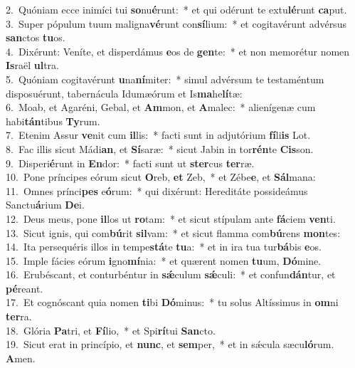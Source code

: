 {2.~}Quóniam ecce inimíci tui \textbf{so}nu\textbf{é}runt:~* et qui odérunt te extu\textbf{lé}runt \textbf{ca}put.\\
{3.~}Super pópulum tuum maligna\textbf{vé}runt con\textbf{sí}lium:~* et cogitavérunt advérsus \textbf{san}ctos \textbf{tu}os.\\
{4.~}Dixérunt: Veníte, et disperdámus \textbf{e}os de \textbf{gen}te:~* et non memorétur nomen \textbf{Is}raël \textbf{ul}tra.\\
{5.~}Quóniam cogitavérunt \textbf{u}na\textbf{ní}miter:~* simul advérsum te testaméntum disposuérunt, tabernácula Idumæórum et Is\textbf{ma}he\textbf{lí}tæ:\\
{6.~}Moab, et Agaréni, Gebal, et \textbf{Am}mon, et \textbf{A}malec:~* alienígenæ cum habi\textbf{tán}tibus \textbf{Ty}rum.\\
{7.~}Etenim Assur \textbf{ve}nit cum \textbf{il}lis:~* facti sunt in adjutórium \textbf{fí}li\textbf{is} Lot.\\
{8.~}Fac illis sicut Mádi\textbf{an}, et \textbf{Sí}saræ:~* sicut Jabin in tor\textbf{rén}te \textbf{Cis}son.\\
{9.~}Disperi\textbf{é}runt in \textbf{En}dor:~* facti sunt ut \textbf{ster}cus \textbf{ter}ræ.\\
{10.~}Pone príncipes eórum sicut \textbf{O}reb, \textbf{et} Zeb,~* et Zébe\textbf{e}, et \textbf{Sál}mana:\\
{11.~}Omnes prínci\textbf{pes} e\textbf{ó}rum:~* qui dixérunt: Hereditáte possideámus Sanctu\textbf{á}rium \textbf{De}i.\\
{12.~}Deus meus, pone \textbf{il}los ut \textbf{ro}tam:~* et sicut stípulam ante \textbf{fá}ciem \textbf{ven}ti.\\
{13.~}Sicut ignis, qui com\textbf{bú}rit \textbf{sil}vam:~* et sicut flamma com\textbf{bú}rens \textbf{mon}tes:\\
{14.~}Ita persequéris illos in tempe\textbf{stá}te \textbf{tu}a:~* et in ira tua tur\textbf{bá}bis \textbf{e}os.\\
{15.~}Imple fácies eórum \textbf{i}gno\textbf{mí}nia:~* et quærent nomen \textbf{tu}um, \textbf{Dó}mine.\\
{16.~}Erubéscant, et conturbéntur in \textbf{sǽ}culum \textbf{sǽ}culi:~* et confun\textbf{dán}tur, et \textbf{pé}reant.\\
{17.~}Et cognóscant quia nomen \textbf{ti}bi \textbf{Dó}minus:~* tu solus Altíssimus in \textbf{om}ni \textbf{ter}ra.\\
{18.~}Glória \textbf{Pa}tri, et \textbf{Fí}lio,~* et Spi\textbf{rí}tui \textbf{San}cto.\\
{19.~}Sicut erat in princípio, et \textbf{nunc}, et \textbf{sem}per,~* et in sǽcula sæcu\textbf{ló}rum. \textbf{A}men.\\
